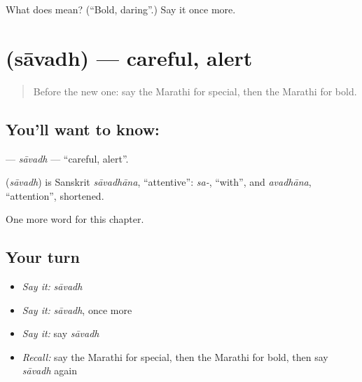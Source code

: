 \begin{tcolorbox}[breakable,colback=teal!4,colframe=teal!35!black,title={Before you move on}]
What does  mean? (\textquotedblleft{}Bold, daring\textquotedblright{}.) Say it once more.
\end{tcolorbox}
\section[\texorpdfstring{\mr{सावध} (sāvadh)}{सावध (sāvadh)}]{ (sāvadh) — careful, alert}

\label{lesson:MR-C207-savadh}



\begin{quote}
Before the new one: say the Marathi for special, then the Marathi for bold.
\end{quote}

\subsection*{You'll want to know: }
\textbf{} — \emph{sāvadh} — \textquotedblleft{}careful, alert\textquotedblright{}.

\begin{cousinweb}
\textbf{} (\emph{sāvadh}) is Sanskrit \emph{sāvadhāna}, \textquotedblleft{}attentive\textquotedblright{}: \emph{sa-}, \textquotedblleft{}with\textquotedblright{}, and \emph{avadhāna}, \textquotedblleft{}attention\textquotedblright{}, shortened.
\end{cousinweb}

\begin{grammarlens}[title={What you've built}]
One more word for this chapter.
\end{grammarlens}

\subsection*{Your turn}
\begin{itemize}
\raggedright
  \item \emph{Say it:} \emph{sāvadh}
  \item \emph{Say it:} \emph{sāvadh}, once more
  \item \emph{Say it:} say \emph{sāvadh}
  \item \emph{Recall:} say the Marathi for special, then the Marathi for bold, then say \emph{sāvadh} again
\end{itemize}

